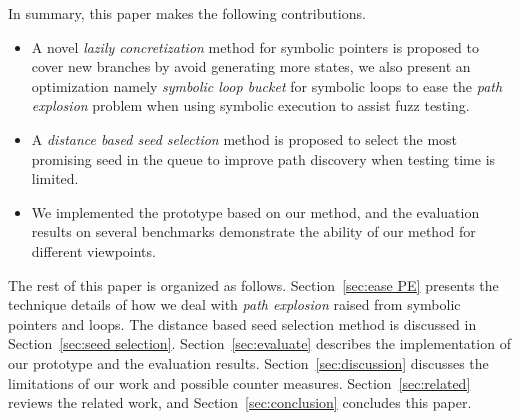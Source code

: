 In summary, this paper makes the following contributions.
\begin{itemize}
\item A novel \emph{lazily concretization} method for symbolic pointers is proposed to cover new branches by avoid generating more states, we also present an optimization namely \emph{symbolic loop bucket} for symbolic loops to ease the \emph{path explosion} problem when using symbolic execution to assist fuzz testing.

\item A \emph{distance based seed selection} method is proposed to select the most promising seed in the queue to improve path discovery when testing time is limited. 

\item We implemented the prototype based on our method, and the evaluation results on several benchmarks demonstrate the ability of our method for different viewpoints.
\end{itemize}

The rest of this paper is organized as follows. Section~\ref{sec:ease PE} presents the technique details of how we deal with \textit{path explosion} raised from symbolic pointers and loops. The distance based seed selection method is discussed in Section~\ref{sec:seed selection}. Section~\ref{sec:evaluate} describes the implementation of our prototype and the evaluation results. Section~\ref{sec:discussion} discusses the limitations of our work and possible counter measures. Section~\ref{sec:related} reviews the related work, and Section~\ref{sec:conclusion} concludes this paper.
